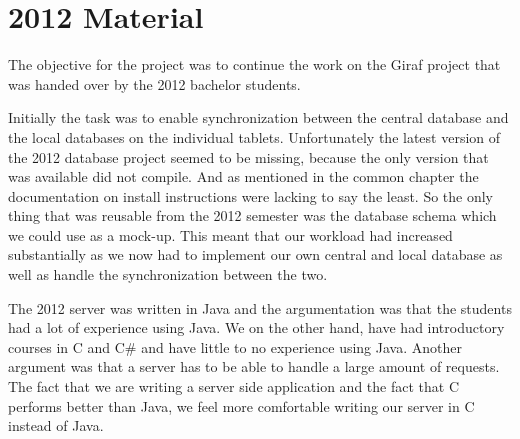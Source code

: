 \section{2012 Material}
The objective for the project was to continue the work on the Giraf project that was handed over by the 2012 bachelor students. 

Initially the task was to enable synchronization between the central database and the local databases on the individual tablets. Unfortunately the latest version of the 2012 database project seemed to be missing, because the only version that was available did not compile. And as mentioned in the common chapter  the documentation on install instructions were lacking to say the least. So the only thing that was reusable from the 2012 semester was the database schema which we could use as a mock-up. This meant that our workload had increased substantially as we now had to implement our own central and local database as well as handle the synchronization between the two.


The 2012 server was written in Java and the argumentation was that the students had a lot of experience using Java. We on the other hand, have had introductory courses in C and C\# and have little to no experience using Java. Another argument was that a server has to be able to handle a large amount of requests. The fact that we are writing a server side application and the fact that C performs better than Java, we feel more comfortable writing our server in C instead of Java.